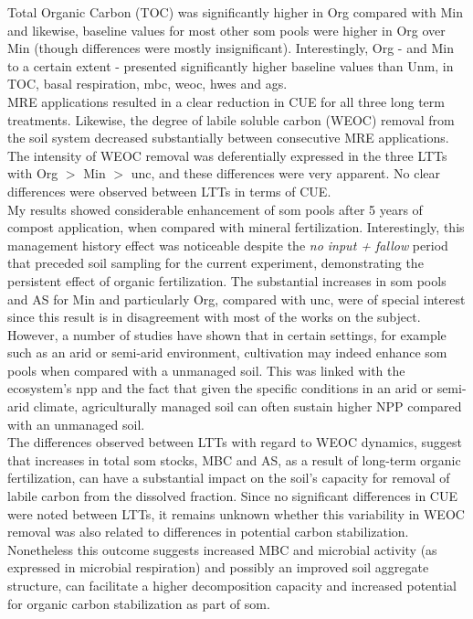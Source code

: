 Total Organic Carbon (TOC) was significantly higher in Org compared with Min
and likewise, baseline values  for most other \gls{som} pools were higher in
Org over Min (though differences were mostly insignificant). Interestingly,
Org - and Min to a certain extent - presented significantly higher baseline values than Unm, in TOC, basal respiration, \gls{mbc}, \gls{weoc}, \gls{hwes} and \gls{ags}.\\ 
MRE applications resulted in a clear reduction in CUE for all three long term treatments. Likewise, the degree of labile soluble carbon (WEOC) removal from the soil system decreased substantially between consecutive MRE applications. The intensity of WEOC removal was deferentially expressed in the three LTTs with Org $  > $ Min $ > $ \gls{unc}, and these differences were very apparent. No clear differences were observed between LTTs in terms of CUE.\\
My results showed considerable enhancement of \gls{som} pools after 5 years of compost application, when compared with mineral fertilization. Interestingly, this management history effect was noticeable despite the \textit{no input + fallow} period that preceded soil sampling for the current experiment, demonstrating the persistent effect of organic fertilization. The substantial increases in \gls{som} pools and AS for Min and particularly Org, compared with \gls{unc}, were of special interest since this result is in disagreement with most  of the works on the subject. However, a number of studies have shown that in certain settings, for example such as an arid or semi-arid environment, cultivation may indeed enhance \gls{som} pools when compared with a unmanaged soil. This was linked with the ecosystem's \gls{npp} and the fact that given the specific conditions in an arid or semi-arid climate, agriculturally managed soil can often sustain higher NPP compared with an unmanaged soil.\\
The differences observed between LTTs with regard to WEOC dynamics, suggest that increases in total \gls{som} stocks, MBC and AS, as a result of long-term organic fertilization, can have a substantial impact on the soil's capacity for removal of labile carbon from the dissolved fraction. Since no significant differences in CUE were noted between LTTs, it remains unknown whether this variability in WEOC removal was also related to differences in potential carbon stabilization. Nonetheless this outcome suggests increased MBC and microbial activity (as expressed in microbial respiration) and possibly an improved soil aggregate structure, can facilitate a higher decomposition capacity and increased potential for organic carbon stabilization as part of \gls{som}.\\
